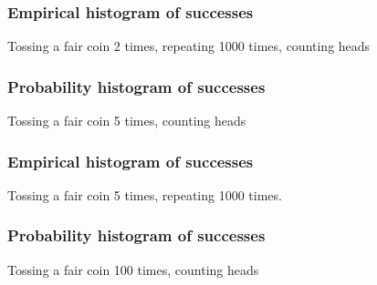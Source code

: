 \documentclass[handout]{beamer}
\begin{document}
   \begin{frame}
   \frametitle{Empirical histogram of successes}
   \begin{center}
   \end{center}
   Tossing a fair coin 2 times, repeating 1000 times, counting heads
   \end{frame}



   \begin{frame}
   \frametitle{Probability histogram of successes}
   \begin{center}
   \end{center}
   Tossing a fair coin 5 times, counting heads
   \end{frame}



   \begin{frame}
   \frametitle{Empirical histogram of successes}
   \begin{center}
   \end{center}
   Tossing a fair coin 5 times, repeating 1000 times.
   \end{frame}



   \begin{frame}
   \frametitle{Probability histogram of successes}
   \begin{center}
   \end{center}
   Tossing a fair coin 100 times, counting heads
   \end{frame}
\end{document}

